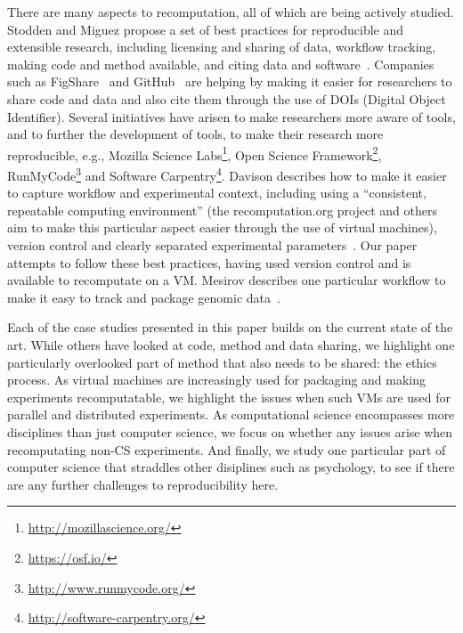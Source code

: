 There are many aspects to recomputation, all of which are being
actively studied. Stodden and Miguez propose a set of best practices
for reproducible and extensible research, including licensing and
sharing of data, workflow tracking, making code and method available,
and citing data and software~\cite{stodden:practices}. 
Companies such as FigShare~\cite{figshare:citable} and
GitHub~\cite{github:citable} are helping by making it easier for
researchers to share code and data and also cite them through the use
of DOIs (Digital Object Identifier). Several initiatives have arisen
to make researchers more aware of tools, and to further the
development of tools, to make their research more reproducible, e.g.,
Mozilla Science Labs\footnote{\url{http://mozillascience.org/}}, Open
Science Framework\footnote{\url{https://osf.io/}}, 
RunMyCode\footnote{\url{http://www.runmycode.org/}} and 
Software Carpentry\footnote{\url{http://software-carpentry.org/}}. Davison
describes how to make it easier to capture workflow and experimental
context, including using a ``consistent, repeatable computing
environment'' (the recomputation.org project and
others~\cite{howe:reproducible} aim to make this particular aspect
easier through the use of virtual machines), version control and
clearly separated experimental
parameters~\cite{davison:reproducibility}. Our paper attempts to
follow these best practices, having used version control and is
available to recomputate on a VM.  Mesirov describes one particular
workflow to make it easy to track and package genomic
data~\cite{mesirov:accessible}. 

Each of the case studies presented in this paper builds on the current
state of the art. While others have looked at code, method and data
sharing, we highlight one particularly overlooked part of method that
also needs to be shared: the ethics process. As virtual machines are
increasingly used for packaging and making experiments recomputatable,
we highlight the issues when such VMs are used for parallel and
distributed experiments. As computational science encompasses more
disciplines than just computer science, we focus on whether any issues
arise when recomputating non-CS experiments. And finally, we study one
particular part of computer science that straddles other disiplines
such as psychology, to see if there are any further challenges to
reproducibility here.
%
%
